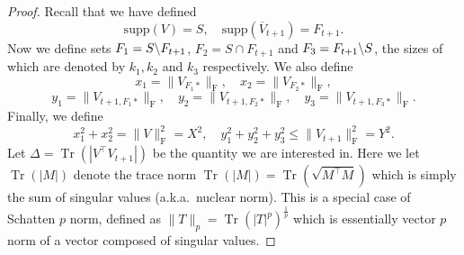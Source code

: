 \documentclass[11pt]{article}
\newcommand{\nb}[1]{\textcolor{orange}{\texttt{[#1]}}}
\newcommand{\scale}{V}
\newcommand{\gd}{\overline{V}}
\DeclareMathOperator{\Tr}{Tr}
\newcommand{\0}{{\mathbf{0}}}
\begin{document}
\begin{proof}
Recall that we have defined 
\begin{equation*}
\mathrm{supp}(\scale)=S,\quad \mathrm{supp}(\gd_{t+1})=F_{t+1}.
\end{equation*}
Now we define sets $F_1=S\symbol{92}F_{t+1}$, $F_2=S\cap F_{t+1}$ and $F_3=F_{t+1}\symbol{92}S$, the sizes of which are denoted by $k_1,k_2$ and $k_3$ respectively. 
We also define 
\begin{equation*}
    x_1=\|\scale_{F_1*}\|_\mathrm{F},\quad x_2=\|\scale_{F_2*}\|_\mathrm{F},
    \end{equation*}
\begin{equation*}
    y_1=\|V_{t+1,F_1*}\|_\mathrm{F},\quad
   y_2=\|V_{t+1,F_2*}\|_\mathrm{F},\quad
    y_3 = \|V_{t+1,F_3*}\|_\mathrm{F}.
\end{equation*}
Finally, we define 
\begin{equation*}
    x_1^2+x_2^2=\|\scale\|_\mathrm{F}^2=X^2,\quad y_1^2+y_2^2+y_3^2\leq \|V_{t+1}\|_\mathrm{F}^2=Y^2.
\end{equation*}
Let $\Delta=\Tr(|{\scale}^\top  V_{t+1}|)$ be the quantity we are interested in. 
Here we let $\Tr(|M|)$ denote the trace norm
$\Tr(|M|)=\Tr(\sqrt{M^\top  M})$
which is simply the sum of singular values (a.k.a.~nuclear norm). 
This is a special case of Schatten $p$ norm, defined as $\|T\|_p = \Tr(|T|^p)^{\frac{1}{p}}$ which is essentially vector $p$ norm of a vector composed of singular values. 


\end{proof}
\end{document}
